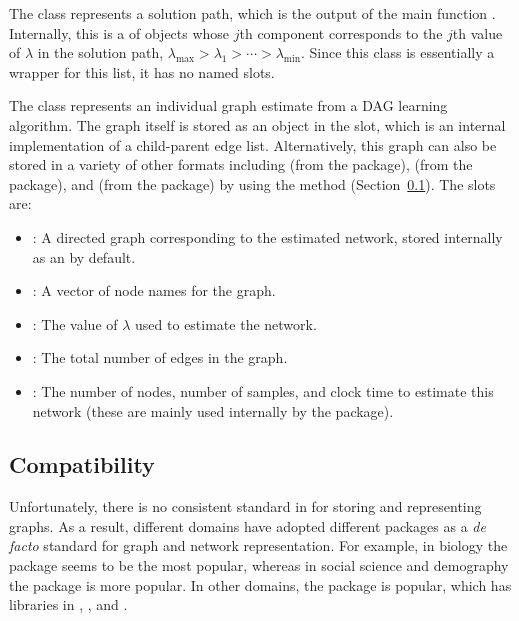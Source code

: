 \documentclass[article]{jss}
\renewcommand{\|}{\,|\,}
\begin{document}
The  class represents a solution path, which is the output of the main function . Internally, this is a  of  objects whose $j$th component corresponds to the $j$th value of $\lambda$ in the solution path, $\lambda_{\max}>\lambda_{1}>\cdots>\lambda_{\min}$. Since this class is essentially a wrapper for this list, it has no named slots.

The  class represents an individual graph estimate from a DAG learning algorithm. The graph itself is stored as an  object in the  slot, which is an internal implementation of a child-parent edge list. Alternatively, this graph can also be stored in a variety of other formats including  (from the  package),  (from the  package), and  (from the  package) by using the  method (Section~\ref{subsec:compat}). The slots are:

\begin{itemize}
\item {}: A directed graph corresponding to the estimated network, stored internally as an  by default.
\item {}: A vector of node names for the graph.
\item {}: The value of $\lambda$ used to estimate the network.
\item {}: The total number of edges in the graph.
\item {}: The number of nodes, number of samples, and clock time to estimate this network (these are mainly used internally by the package).
\end{itemize}

\subsection{Compatibility}
\label{subsec:compat}

Unfortunately, there is no consistent standard in  for storing and representing graphs. As a result, different domains have adopted different  packages as a \emph{de facto} standard for graph and network representation. For example, in biology the  package \citep{gentleman2016} seems to be the most popular, whereas in social science and demography the  package \citep{butts2008} is more popular. In other domains, the  package \citep{csardi2006} is popular, which has libraries in , , and . 
\end{document}
